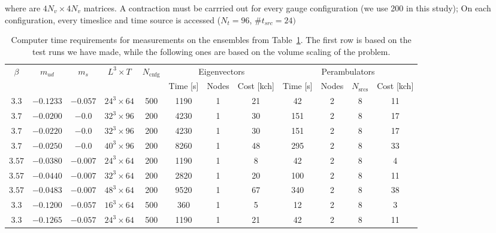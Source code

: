 where are $4N_v \times 4N_v$ matrices. A contraction must be carrried out for every gauge configuration (we use 200 in this study); On each configuration, every timeslice and time source is accessed ($N_t = 96$,  $\#t_{src} = 24)$ 

\begin{table}[!h]
  \centering \footnotesize
  \hspace*{-0.6cm}
  \begin{tabular}{|c|c|c|c|c|c|c|c|c|c|c|c|}
  \hline
  \multirow{2}{*}{$\beta$}  & \multirow{2}{*}{$m_{ud}$}   & \multirow{2}{*}{$m_{s}$}   & \multirow{2}{*}{$L^3 \times T$}  & \multirow{2}{*}{$N_\mathrm{cnfg}$} & \multicolumn{3}{c|}{Eigenvectors} & \multicolumn{4}{c|}{Perambulators} \\
  & & & & & Time [s] & Nodes & Cost [kch] & Time [s] & Nodes & $N_\mathrm{srcs}$ & Cost [kch] \\
  \hline \hline
  $3.3$    & $-0.1233$  & $-0.057$  & $24^3\times64$  & 500  & 1190 & 1 & 21  & 42  & 2 & 8 & 11  \\ \hline
  $3.7$    & $-0.0200$  & $-0.0$    & $32^3\times96$  & 200  & 4230 & 1 & 30  & 151 & 2 & 8 & 17  \\ 
  $3.7$    & $-0.0220$  & $-0.0$    & $32^3\times96$  & 200  & 4230 & 1 & 30  & 151 & 2 & 8 & 17  \\ 
  $3.7$    & $-0.0250$  & $-0.0$    & $40^3\times96$  & 200  & 8260 & 1 & 48  & 295 & 2 & 8 & 33  \\ \hline
  $3.57$   & $-0.0380$  & $-0.007$  & $24^3\times64$  & 200  & 1190 & 1 & 8   & 42  & 2 & 8 & 4   \\ 
  $3.57$   & $-0.0440$  & $-0.007$  & $32^3\times64$  & 200  & 2820 & 1 & 20  & 100 & 2 & 8 & 11  \\ 
  $3.57$   & $-0.0483$  & $-0.007$  & $48^3\times64$  & 200  & 9520 & 1 & 67  & 340 & 2 & 8 & 38  \\ \hline
  $3.3$    & $-0.1200$  & $-0.057$  & $16^3\times64$  & 500  & 360  & 1 & 5   & 12  & 2 & 8 & 3   \\ 
  $3.3$    & $-0.1265$  & $-0.057$  & $24^3\times64$  & 500  & 1190 & 1 & 21  & 42  & 2 & 8 & 11  \\ \hline
  \end{tabular}
  \caption{Computer time requirements for measurements on the ensembles from Table~\ref{tab:ensembles}. The first row is based on the test runs we have made, while the following ones are based on the volume scaling of the problem.}
  \label{tab:ensembles}
  \end{table}




